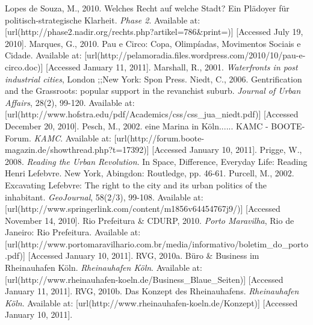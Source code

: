 {%
Lopes de Souza, M., 2010. Welches Recht auf welche Stadt? Ein Plädoyer für politisch-strategische Klarheit. {\em Phase 2}. Available at:  [url(http://phase2.nadir.org/rechts.php?artikel=786&print=)] [Accessed July 19, 2010]. \nl%
%
Marques, G., 2010. Pau e Circo: Copa, Olimpíadas, Movimentos Sociais e Cidade. Available at:  [url(http://pelamoradia.files.wordpress.com/2010/10/pau-e-circo.doc)] [Accessed January 11, 2011]. \nl%
%
Marshall, R., 2001. {\em Waterfronts in post industrial cities}, London ;;New York: Spon Press. \nl%
%
Niedt, C., 2006. Gentrification and the Grassroots: popular support in the revanchist suburb. {\em Journal of Urban Affairs}, 28(2), 99-120. Available at:  [url(http://www.hofstra.edu/pdf/Academics/css/css_jua_niedt.pdf)] [Accessed December 20, 2010]. \nl%
%
Pesch, M., 2002. eine Marina in Köln...... KAMC - BOOTE-Forum. {\em KAMC}. Available at:  [url(http://forum.boote-magazin.de/showthread.php?t=17392)] [Accessed January 10, 2011]. \nl%
%
Prigge, W., 2008. {\em Reading the Urban Revolution}. In Space, Difference, Everyday Life: Reading Henri Lefebvre.  New York, Abingdon: Routledge, pp. 46-61. \nl%
%
Purcell, M., 2002. Excavating Lefebvre: The right to the city and its urban politics of the inhabitant. {\em GeoJournal}, 58(2/3), 99-108. Available at:  [url(http://www.springerlink.com/content/m1856v64454767j9/)] [Accessed November 14, 2010]. \nl%
%
Rio Prefeitura \& CDURP, 2010. {\em Porto Maravilha}, Rio de Janeiro: Rio Prefeitura. Available at:  [url(http://www.portomaravilhario.com.br/media/informativo/boletim_do_porto.pdf)] [Accessed January 10, 2011]. \nl%
%
RVG, 2010a. Büro \& Business im Rheinauhafen Köln. {\em Rheinauhafen Köln}. Available at:  [url(http://www.rheinauhafen-koeln.de/Business_Blaue_Seiten)] [Accessed January 11, 2011]. \nl%
%
RVG, 2010b. Das Konzept des Rheinauhafens. {\em Rheinauhafen Köln}. Available at:  [url(http://www.rheinauhafen-koeln.de/Konzept)] [Accessed January 10, 2011]. \nl%
}
